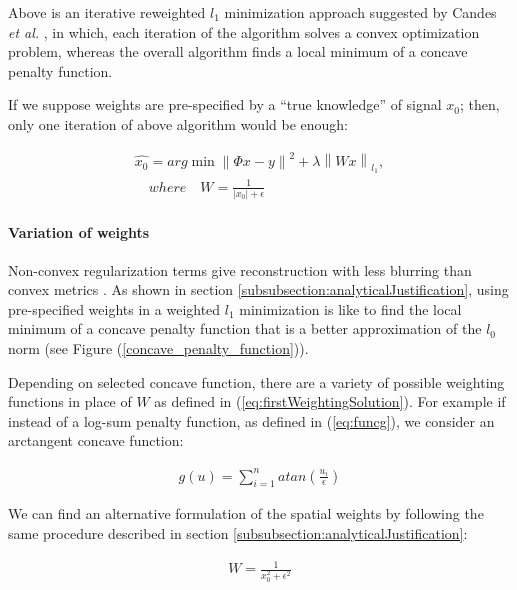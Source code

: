 Above is an iterative reweighted $l_{1}$ minimization approach suggested by Candes \emph{et al.} \cite{candes2008enhancing}, in which, each iteration of the algorithm solves a convex optimization problem, whereas the overall algorithm finds a local minimum of a concave penalty function.

If we suppose weights are pre-specified by a ``true knowledge'' of signal $x_{0}$; then, only one iteration of above algorithm would be enough:

\begin{equation}
\label{eq:firstWeightingSolution}
\begin{gathered}
\hat{x_{0}} = arg \min \left \| \Phi x-y \right \|^{2} + \lambda \left \| Wx \right \|_{l_{1}}, \\
\quad where \quad W = \frac{1}{\left | x_{0} \right |+\epsilon }
\end{gathered}
\end{equation}

\paragraph{Variation of weights} %

Non-convex regularization terms give reconstruction with less blurring than convex metrics \cite{yang2013}. As shown in section \ref{subsubsection:analyticalJustification}, using pre-specified weights in a weighted $l_1$ minimization is like to find the local minimum of a concave penalty function that is a better approximation of the $l_0$ norm (see Figure (\ref{concave_penalty_function})).

Depending on selected concave function, there are a variety of possible weighting functions in place of $W$ as defined in (\ref{eq:firstWeightingSolution}). For example if instead of a log-sum penalty function, as defined in (\ref{eq:funcg}), we consider an arctangent concave function:

\begin{equation}
\label{eq:atan}
\begin{gathered}
g\left ( u \right ) =
\sum_{i=1}^{n} atan(\frac{u_{i}}{\epsilon })
\end{gathered}
\end{equation}

We can find an alternative formulation of the spatial weights by following the same procedure described in section \ref{subsubsection:analyticalJustification}:

\begin{equation}
\label{eq:newWeights}
\begin{gathered}
W = \frac{1}{ x_{0}^{2}+\epsilon^{2} }
\end{gathered}
\end{equation}

